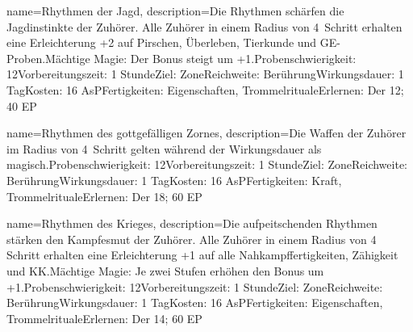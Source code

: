 {
    name={Rhythmen der Jagd},
    description={Die Rhythmen schärfen die Jagdinstinkte der Zuhörer. Alle Zuhörer in einem Radius von 4 Schritt erhalten eine Erleichterung +2 auf Pirschen, Überleben, Tierkunde und GE-Proben.\newline Mächtige Magie: Der Bonus steigt um +1.\newline Probenschwierigkeit: 12\newline Vorbereitungszeit: 1 Stunde\newline Ziel: Zone\newline Reichweite: Berührung\newline Wirkungsdauer: 1 Tag\newline Kosten: 16 AsP\newline Fertigkeiten: Eigenschaften, Trommelrituale\newline Erlernen: Der 12; 40 EP}
}


{
    name={Rhythmen des gottgefälligen Zornes},
    description={Die Waffen der Zuhörer im Radius von 4 Schritt gelten während der Wirkungsdauer als magisch.\newline Probenschwierigkeit: 12\newline Vorbereitungszeit: 1 Stunde\newline Ziel: Zone\newline Reichweite: Berührung\newline Wirkungsdauer: 1 Tag\newline Kosten: 16 AsP\newline Fertigkeiten: Kraft, Trommelrituale\newline Erlernen: Der 18; 60 EP}
}


{
    name={Rhythmen des Krieges},
    description={Die aufpeitschenden Rhythmen stärken den Kampfesmut der Zuhörer. Alle Zuhörer in einem Radius von 4 Schritt erhalten eine Erleichterung +1 auf alle Nahkampffertigkeiten, Zähigkeit und KK.\newline Mächtige Magie: Je zwei Stufen erhöhen den Bonus um +1.\newline Probenschwierigkeit: 12\newline Vorbereitungszeit: 1 Stunde\newline Ziel: Zone\newline Reichweite: Berührung\newline Wirkungsdauer: 1 Tag\newline Kosten: 16 AsP\newline Fertigkeiten: Eigenschaften, Trommelrituale\newline Erlernen: Der 14; 60 EP}
}


